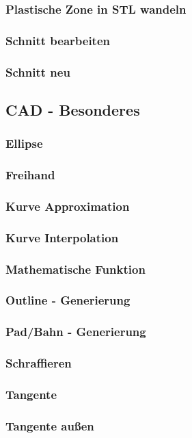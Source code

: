 \documentclass[a4paper]{book}
\begin{document}
			\subsubsection{Plastische Zone in STL wandeln}
			\subsubsection{Schnitt bearbeiten}
			\subsubsection{Schnitt neu}
		\subsection{CAD - Besonderes}
			\subsubsection{Ellipse}
			\subsubsection{Freihand}
			\subsubsection{Kurve Approximation}
			\subsubsection{Kurve Interpolation}
			\subsubsection{Mathematische Funktion}
			\subsubsection{Outline - Generierung}
			\subsubsection{Pad/Bahn - Generierung}
			\subsubsection{Schraffieren}
			\subsubsection{Tangente}
			\subsubsection{Tangente außen}
\end{document}
